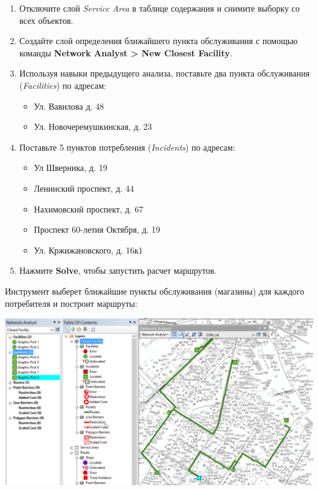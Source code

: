 \documentclass[12pt,]{book}
\providecommand{\tightlist}{%
  \setlength{\itemsep}{0pt}\setlength{\parskip}{0pt}}
\begin{document}
\begin{enumerate}
\def\labelenumi{\arabic{enumi}.}
\item
  Отключите слой \emph{Service Area} в таблице содержания и снимите выборку со всех объектов.
\item
  Создайте слой определения ближайшего пункта обслуживания с помощью команды \textbf{Network Analyst \textgreater{} New Closest Facility}.
\item
  Используя навыки предыдущего анализа, поставьте два пункта обслуживания (\emph{Facilities}) по адресам:

  \begin{itemize}
  \tightlist
  \item
    Ул. Вавилова д. 48
  \item
    Ул. Новочеремушкинская, д. 23
  \end{itemize}
\item
  Поставьте 5 пунктов потребления (\emph{Incidents}) по адресам:

  \begin{itemize}
  \item
    Ул Шверника, д. 19
  \item
    Ленинский проспект, д. 44
  \item
    Нахимовский проспект, д. 67
  \item
    Проспект 60-летия Октября, д. 19
  \item
    Ул. Кржижановского, д. 16к1
  \end{itemize}
\item
  Нажмите \textbf{Solve}, чтобы запустить расчет маршрутов.
\end{enumerate}

Инструмент выберет ближайшие пункты обслуживания (магазины) для каждого потребителя и построит маршруты:

\includegraphics{images/Ex12/image20.png}
\end{document}
